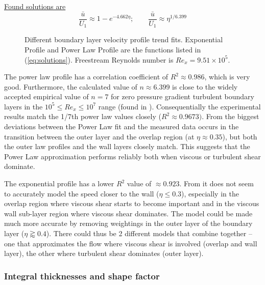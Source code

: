 \documentclass{article}
\begin{document}
\underline{Found solutions are}
\begin{equation}
    \frac{\bar{u}}{U_1} \approx 1-e^{-4.662\eta}; \qquad \frac{\bar{u}}{U_1} \approx \eta^{1/6.399}
    \label{eq:solutions}
\end{equation}

\begin{figure}
    \centering
    
    \caption{Different boundary layer velocity profile trend fits. Exponential Profile and Power Law Profile are the functions listed in (\ref{eq:solutions}). Freestream Reynolds number is $Re_x = 9.51 \times 10^5$.}
    \label{fig:velocity fits}
\end{figure}

The power law profile has a correlation coefficient of $R^2 \approx 0.986$, which is very good. Furthermore, the calculated value of $n \approx 6.399$ is close to the widely accepted empirical value of $n=7$ for zero pressure gradient turbulent boundary layers in the $10^5 \le Re_x \le 10^7$ range (found in \cite{schlichting1961boundary}). Consequentially the experimental results match the 1/7th power law values closely ($R^2 \approx 0.9673)$. From  the biggest deviations between the Power Law fit and the measured data occurs in the transition between the outer layer and the overlap region (at $\eta \approx 0.35$), but both the outer law profiles and the wall layers closely match. This suggests that the Power Law approximation performs reliably both when viscous or turbulent shear dominate.

The exponential profile has a lower $R^2$ value of $\approx 0.923$. From  it does not seem to accurately model the speed closer to the wall ($\eta \le 0.3$), especially in the overlap region where viscous shear starts to become important and in the viscous wall sub-layer region where viscous shear dominates. The model could be made much more accurate by removing weightings in the outer layer of the boundary layer ($\eta \gtrapprox 0.4$). There could thus be 2 different models that combine together -- one that approximates the flow where viscous shear is involved (overlap and wall layer), the other where turbulent shear dominates (outer layer).

\subsubsection{Integral thicknesses and shape factor}
\end{document}

